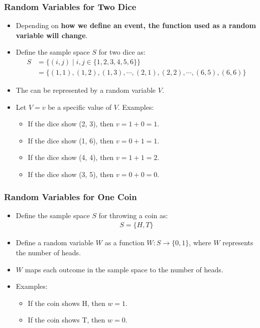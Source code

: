 \documentclass[handout]{beamer} %
\begin{document}
\begin{frame}
    \frametitle{Random Variables for Two Dice}
    \begin{itemize}
        \item Depending on \textbf{how we define an event, the function used as a random variable will change}.
        \item Define the sample space \( S \) for two dice as: \pause
        \begin{align*}
        S &= \big\{(i, j) \mid i, j \in \big\{1, 2, 3, 4, 5, 6\big\}\big\} \\
          &= \big\{(1,1), (1,2), (1,3), \cdots, (2,1), (2,2), \cdots, (6,5), (6,6)\big\}
        \end{align*} \pause \vspace{-1.5em}
        \item The  can be represented by a random variable \( V \). \pause
        \item Let $V=v$ be a specific value of $V$. Examples: \pause
        \begin{itemize}
            \item If the dice show (2, 3), then \( v = 1 + 0 = 1 \). \pause
            \item If the dice show (1, 6), then \( v = 0 + 1 = 1 \). \pause
            \item If the dice show (4, 4), then \( v = 1 + 1 = 2 \). \pause
            \item If the dice show (3, 5), then \( v = 0 + 0 = 0 \). \pause
        \end{itemize}
    \end{itemize}
\end{frame}


\begin{frame}
    \frametitle{Random Variables for One Coin}
    \begin{itemize}
        \item Define the sample space \( S \) for throwing a coin as: \pause
        \begin{align*}
        S = \big\{H, T\big\}
        \end{align*} \pause \vspace{-1.5em}
        \item Define a random variable \( W \) as a function \( W: S \rightarrow \{0, 1\} \), where \( W \) represents the number of heads. \pause
        \item \( W \) maps each outcome in the sample space to the number of heads. \pause
        \item Examples: \pause
        \begin{itemize}
            \item If the coin shows H, then \( w = 1 \). \pause
            \item If the coin shows T, then \( w = 0 \). \pause
        \end{itemize}
    \end{itemize}
\end{frame}
\end{document}
